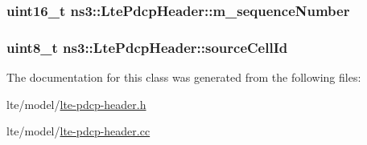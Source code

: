 \subsubsection[{\texorpdfstring{m\+\_\+sequence\+Number}{m_sequenceNumber}}]{\setlength{\rightskip}{0pt plus 5cm}uint16\+\_\+t ns3\+::\+Lte\+Pdcp\+Header\+::m\+\_\+sequence\+Number\hspace{0.3cm}{\ttfamily [private]}}\hypertarget{classns3_1_1LtePdcpHeader_a9302a2f08877e069a3d417721e898204}{}\label{classns3_1_1LtePdcpHeader_a9302a2f08877e069a3d417721e898204}
\subsubsection[{\texorpdfstring{source\+Cell\+Id}{sourceCellId}}]{\setlength{\rightskip}{0pt plus 5cm}uint8\+\_\+t ns3\+::\+Lte\+Pdcp\+Header\+::source\+Cell\+Id\hspace{0.3cm}{\ttfamily [private]}}\hypertarget{classns3_1_1LtePdcpHeader_a1a3e927f8d1a684a1453de72724ccf99}{}\label{classns3_1_1LtePdcpHeader_a1a3e927f8d1a684a1453de72724ccf99}


The documentation for this class was generated from the following files\+:\begin{DoxyCompactItemize}
\item 
lte/model/\hyperlink{lte-pdcp-header_8h}{lte-\/pdcp-\/header.\+h}\item 
lte/model/\hyperlink{lte-pdcp-header_8cc}{lte-\/pdcp-\/header.\+cc}\end{DoxyCompactItemize}
